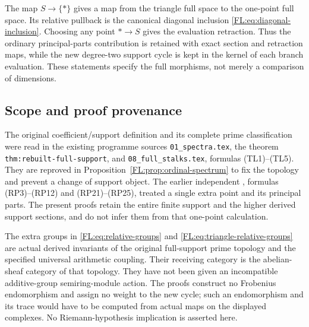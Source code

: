 The map $S\to\{*\}$ gives a map from the triangle full space to the
one-point full space. Its relative pullback is the canonical diagonal
inclusion \eqref{FL:eq:diagonal-inclusion}. Choosing any point
$*\to S$ gives the evaluation retraction. Thus the ordinary
principal-parts contribution is retained with exact section and
retraction maps, while the new degree-two support cycle is kept in
the kernel of each branch evaluation. These statements specify the
full morphisms, not merely a comparison of dimensions.

\subsection{Scope and proof provenance}

The original coefficient/support definition and its complete prime
classification were read in the existing programme sources
\texttt{01\_spectra.tex}, the theorem
\texttt{thm:rebuilt-full-support}, and
\texttt{08\_full\_stalks.tex}, formulas (TL1)--(TL5). They are
reproved in Proposition~\ref{FL:prop:ordinal-spectrum} to fix the topology
and prevent a change of support object. The earlier independent
, formulas (RP3)--(RP12)
and (RP21)--(RP25), treated a single extra point and its principal
parts. The present proofs retain the entire finite support and the
higher derived support sections, and do not infer them from that
one-point calculation.

The extra groups in \eqref{FL:eq:relative-groups} and
\eqref{FL:eq:triangle-relative-groups} are actual derived invariants of
the original full-support prime topology and the specified universal
arithmetic coupling. Their receiving category is the abelian-sheaf
category of that topology. They have not been given an incompatible
additive-group semiring-module action. The proofs construct no
Frobenius endomorphism and assign no weight to the new cycle; such
an endomorphism and its trace would have to be computed from actual
maps on the displayed complexes. No Riemann-hypothesis implication
is asserted here.

